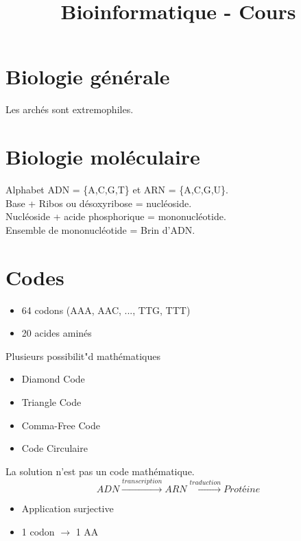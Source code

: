 \documentclass[11pt,a4paper]{article}
\title{Bioinformatique - Cours}
\begin{document}
	
	\maketitle
	\section{Biologie générale}
	Les archés sont extremophiles.
	
	
	\section{Biologie moléculaire}
	Alphabet ADN = \{A,C,G,T\} et ARN = \{A,C,G,U\}.\\
	Base + Ribos ou désoxyribose = nucléoside.\\
	Nucléoside + acide phosphorique = mononucléotide.\\
	Ensemble de mononucléotide = Brin d'ADN.\\
	
	\section{Codes}
	\begin{itemize}
		\item 64 codons (AAA, AAC, ..., TTG, TTT)
		\item 20 acides aminés
	\end{itemize}
	Plusieurs possibilit"d mathématiques
	\begin{itemize}
		\item Diamond Code
		\item Triangle Code
		\item Comma-Free Code
		\item Code Circulaire
	\end{itemize}
	La solution n'est pas un code mathématique.\\
	$$ADN \xrightarrow{transcription} ARN \xrightarrow{traduction} Protéine$$
	\begin{itemize}
		\item Application surjective
		\item 1 codon $\rightarrow$ 1 AA
	\end{itemize}
\end{document}
